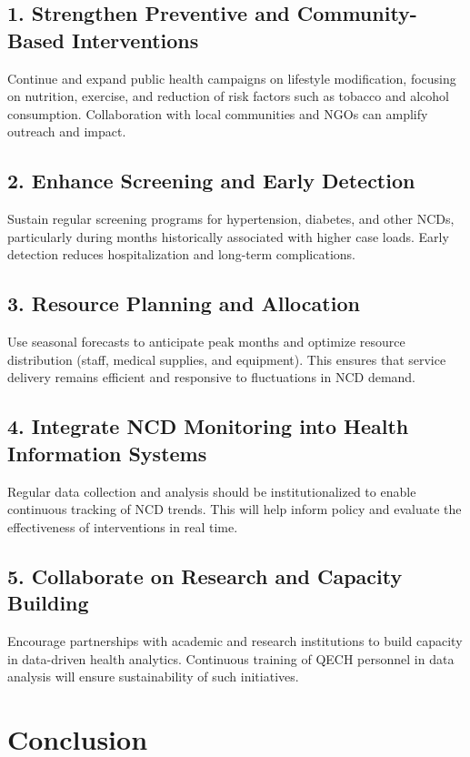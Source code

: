 \documentclass[12pt,a4paper]{report}
\begin{document}
\section*{1. Strengthen Preventive and Community-Based Interventions}
\noindent
Continue and expand public health campaigns on lifestyle modification, focusing on nutrition, exercise, and reduction of risk factors such as tobacco and alcohol consumption. Collaboration with local communities and NGOs can amplify outreach and impact.

\section*{2. Enhance Screening and Early Detection}
\noindent
Sustain regular screening programs for hypertension, diabetes, and other NCDs, particularly during months historically associated with higher case loads. Early detection reduces hospitalization and long-term complications.

\section*{3. Resource Planning and Allocation}
\noindent
Use seasonal forecasts to anticipate peak months and optimize resource distribution (staff, medical supplies, and equipment). This ensures that service delivery remains efficient and responsive to fluctuations in NCD demand.

\section*{4. Integrate NCD Monitoring into Health Information Systems}
\noindent
Regular data collection and analysis should be institutionalized to enable continuous tracking of NCD trends. This will help inform policy and evaluate the effectiveness of interventions in real time.

\section*{5. Collaborate on Research and Capacity Building}
\noindent
Encourage partnerships with academic and research institutions to build capacity in data-driven health analytics. Continuous training of QECH personnel in data analysis will ensure sustainability of such initiatives.

\chapter*{Conclusion}
\end{document}
